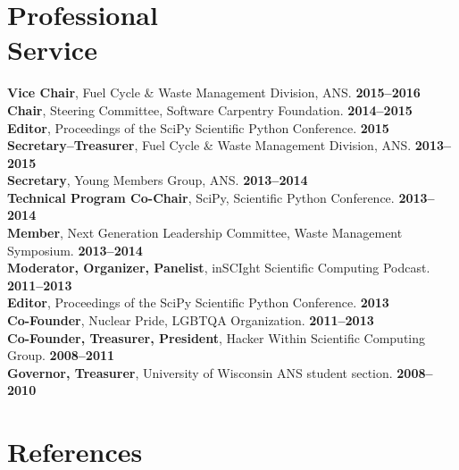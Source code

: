 \documentclass[margin,line]{resume}
\begin{document}
\begin{resume}
    \section{\mysidestyle Professional\\Service}
		\textbf{Vice Chair}, Fuel Cycle \& Waste Management Division, ANS. \hfill \textbf{2015--2016}\vspace{.5mm}\\%
		\textbf{Chair}, Steering Committee, Software Carpentry Foundation.  \hfill \textbf{2014--2015}\vspace{.5mm}\\%
		\textbf{Editor}, Proceedings of the SciPy Scientific Python Conference.  \hfill \textbf{2015}\vspace{.5mm}\\%
		\textbf{Secretary--Treasurer}, Fuel Cycle \& Waste Management Division, ANS. \hfill \textbf{2013--2015}\vspace{.5mm}\\%
		\textbf{Secretary}, Young Members Group, ANS. \hfill \textbf{2013--2014}\vspace{.5mm}\\%
		\textbf{Technical Program Co-Chair}, SciPy, Scientific Python Conference.  \hfill \textbf{2013--2014}\vspace{.5mm}\\%
		\textbf{Member}, Next Generation Leadership Committee, Waste Management Symposium. \hfill \textbf{2013--2014}\vspace{.5mm}\\%
		\textbf{Moderator, Organizer, Panelist}, inSCIght Scientific Computing Podcast. \hfill \textbf{2011--2013}\vspace{.5mm}\\%
		\textbf{Editor}, Proceedings of the SciPy Scientific Python Conference.  \hfill \textbf{2013}\vspace{.5mm}\\%
		\textbf{Co-Founder}, Nuclear Pride, LGBTQA Organization. \hfill \textbf{2011--2013}\vspace{.5mm}\\%
		\textbf{Co-Founder, Treasurer, President}, Hacker Within Scientific Computing Group. \hfill \textbf{2008--2011}\vspace{.5mm}\\%
		\textbf{Governor, Treasurer}, University of Wisconsin ANS student section. \hfill \textbf{2008--2010}\vspace{.5mm}\\%

\section{\mysidestyle References}



\end{resume}
\end{document}

